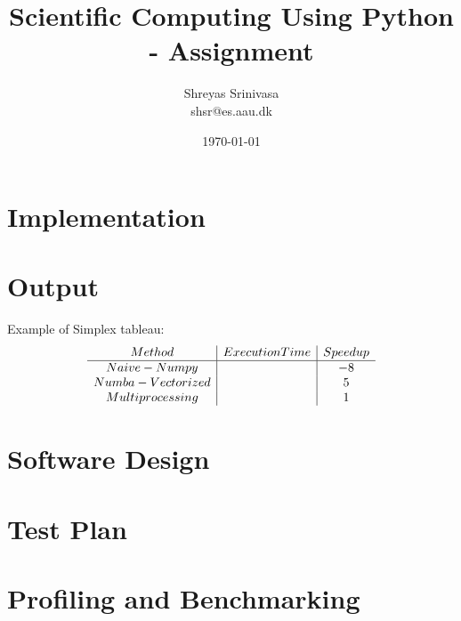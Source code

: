 \documentclass{article}
\title{Scientific Computing Using Python - Assignment}
\author{Shreyas Srinivasa \\ shsr@es.aau.dk}
\date{\today}
\begin{document}
\maketitle

\section{Implementation}

\section{Output}

Example of Simplex tableau:
\begin{align}
    \begin{array}{c | c | c}
         Method  & Execution Time & Speedup \\ 
         \hline %
         Naive-Numpy   &  & -8 \\
         Numba - Vectorized &  & 5 \\
         Multiprocessing &  & 1 \\
    \end{array}
\end{align}

\section{Software Design}

\section{Test Plan}


\section{Profiling and Benchmarking}
\end{document}
